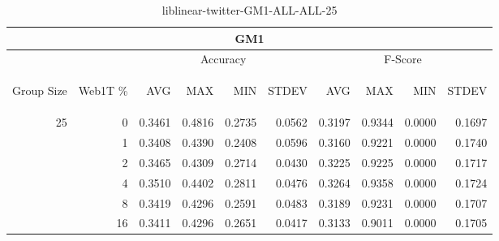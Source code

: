 \begin{center}
\begin{table}[htbp] 
 \begin{center}
\begin{tabular}{ | r | r | r | r | r | r | r | r | r | r |}
\hline
\multicolumn{10}{|c|}{GM1}\\
\hline
 & & \multicolumn{4}{|c|}{Accuracy} & \multicolumn{4}{|c|}{F-Score}\\ \cline{3-10}
\begin{sideways}Group Size\end{sideways} & \begin{sideways}Web1T \%\end{sideways} & \begin{sideways}AVG\end{sideways} & \begin{sideways}MAX\end{sideways} & \begin{sideways}MIN\end{sideways} & \begin{sideways}STDEV\end{sideways} & \begin{sideways}AVG\end{sideways} & \begin{sideways}MAX\end{sideways} & \begin{sideways}MIN\end{sideways} & \begin{sideways}STDEV\end{sideways}\\
\hline
\multirow{5}{*}{25}
 & 0 & 0.3461 & 0.4816 & 0.2735 & 0.0562 & 0.3197 & 0.9344 & 0.0000 & 0.1697\\ \cline{2-10}
 & 1 & 0.3408 & 0.4390 & 0.2408 & 0.0596 & 0.3160 & 0.9221 & 0.0000 & 0.1740\\ \cline{2-10}
 & 2 & 0.3465 & 0.4309 & 0.2714 & 0.0430 & 0.3225 & 0.9225 & 0.0000 & 0.1717\\ \cline{2-10}
 & 4 & 0.3510 & 0.4402 & 0.2811 & 0.0476 & 0.3264 & 0.9358 & 0.0000 & 0.1724\\ \cline{2-10}
 & 8 & 0.3419 & 0.4296 & 0.2591 & 0.0483 & 0.3189 & 0.9231 & 0.0000 & 0.1707\\ \cline{2-10}
 & 16 & 0.3411 & 0.4296 & 0.2651 & 0.0417 & 0.3133 & 0.9011 & 0.0000 & 0.1705\\ \cline{2-10}
\hline
\end{tabular}
\caption{liblinear-twitter-GM1-ALL-ALL-25}
\label{table:liblinear-twitter-GM1-ALL-ALL-25}
\end{center}
 \end{table}
\end{center}

